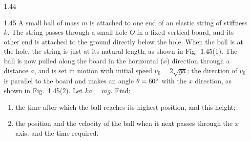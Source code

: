 \begin{figbox}{1.44}
\end{figbox}

\begin{problem}{1.45}
A small ball of mass $m$ is attached to one end of an elastic string of stiffness $k$. The string passes through a small hole $O$ in a fixed vertical board, and its other end is attached to the ground directly below the hole. When the ball is at the hole, the string is just at its natural length, as shown in Fig.~1.45(1). The ball is now pulled along the board in the horizontal ($x$) direction through a distance $a$, and is set in motion with initial speed $v_0=2\sqrt{ga}$; the direction of $v_0$ is parallel to the board and makes an angle $\theta=60^{\circ}$ with the $x$ direction, as shown in Fig.~1.45(2). Let $ka=mg$. Find:
\begin{enumerate}[label=(\arabic*),leftmargin=2.2em,itemsep=1pt,topsep=2pt]
\item the time after which the ball reaches its highest position, and this height;
\item the position and the velocity of the ball when it next passes through the $x$ axis, and the time required.
\end{enumerate}
\end{problem}

